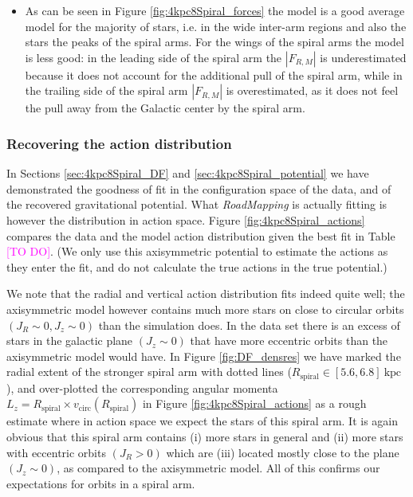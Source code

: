 \documentclass[iop,revtex4,numberedappendix,appendixfloats]{emulateapj}
\newcommand{\RM}{{\sl RoadMapping}}
\newcommand{\Wilma}[1]{\textcolor{Magenta}{#1}}
\begin{document}
\begin{itemize}
\item As can be seen in Figure \ref{fig:4kpc8Spiral_forces} the model is a good average model for the majority of stars, i.e. in the wide inter-arm regions and also the stars the peaks of the spiral arms. For the wings of the spiral arms the model is less good: in the leading side of the spiral arm the $|F_{R,M}|$ is underestimated because it does not account for the additional pull of the spiral arm, while in the trailing side of the spiral arm $|F_{R,M}|$ is overestimated, as it does not feel the pull away from the Galactic center by the spiral arm.
\end{itemize}

\subsubsection{Recovering the action distribution}

In Sections \ref{sec:4kpc8Spiral_DF} and \ref{sec:4kpc8Spiral_potential} we have demonstrated the goodness of fit in the configuration space of the data, and of the recovered gravitational potential. What \RM{} is actually fitting is however the distribution in action space. Figure \ref{fig:4kpc8Spiral_actions} compares the data and the model action distribution given the best fit  in Table \Wilma{[TO DO]}. (We only use this axisymmetric potential to estimate the actions as they enter the fit, and do not calculate the true actions in the true potential.)

We note that the radial and vertical action distribution fits indeed quite well; the axisymmetric model however contains much more stars on close to circular orbits $(J_R \sim 0,J_z \sim 0)$ than the simulation does. In the data set there is an excess of stars in the galactic plane $(J_z\sim0)$ that have more eccentric orbits  than the axisymmetric model would have. In Figure \ref{fig:DF_densres} we have marked the radial extent of the stronger spiral arm with dotted lines ($R_\text{spiral} \in [5.6,6.8]~\text{kpc}$), and over-plotted the corresponding angular momenta $L_z = R_\text{spiral} \times v_\text{circ}(R_\text{spiral})$ in Figure \ref{fig:4kpc8Spiral_actions} as a rough estimate where in action space we expect the stars of this spiral arm. It is again obvious that this spiral arm contains (i) more stars in general and (ii) more stars with eccentric orbits  $(J_R>0)$ which are (iii) located mostly close to the plane $(J_z\sim0)$, as compared to the axisymmetric model. All of this confirms our expectations for orbits in a spiral arm. 
\end{document}
